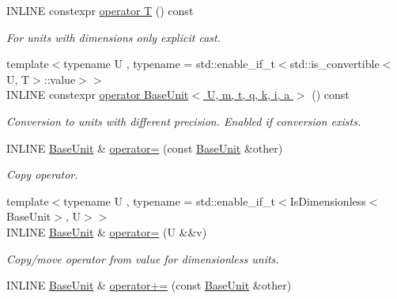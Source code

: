 \begin{DoxyCompactItemize}
I\+N\+L\+I\+NE constexpr \hyperlink{classBaseUnit_a5cf1571b1bb667033c7b6bf3709cd97a}{operator T} () const
\begin{DoxyCompactList}\small\item\em For units with dimensions only explicit cast. \end{DoxyCompactList}\item 
\hypertarget{classBaseUnit_af0040119677b2dd3636fbcab57106249}{}\label{classBaseUnit_af0040119677b2dd3636fbcab57106249} 
{\footnotesize template$<$typename U , typename  = std\+::enable\+\_\+if\+\_\+t$<$std\+::is\+\_\+convertible$<$\+U, T$>$\+::value$>$$>$ }\\I\+N\+L\+I\+NE constexpr \hyperlink{classBaseUnit_af0040119677b2dd3636fbcab57106249}{operator Base\+Unit$<$ U, m, t, q, k, i, a $>$} () const
\begin{DoxyCompactList}\small\item\em Conversion to units with different precision. Enabled if conversion exists. \end{DoxyCompactList}\item 
\hypertarget{classBaseUnit_a57707077e0872e159771390fac355951}{}\label{classBaseUnit_a57707077e0872e159771390fac355951} 
I\+N\+L\+I\+NE \hyperlink{classBaseUnit}{Base\+Unit} \& \hyperlink{classBaseUnit_a57707077e0872e159771390fac355951}{operator=} (const \hyperlink{classBaseUnit}{Base\+Unit} \&other)
\begin{DoxyCompactList}\small\item\em Copy operator. \end{DoxyCompactList}\item 
\hypertarget{classBaseUnit_a11a730f22fec43794e2892634075f829}{}\label{classBaseUnit_a11a730f22fec43794e2892634075f829} 
{\footnotesize template$<$typename U , typename  = std\+::enable\+\_\+if\+\_\+t$<$\+Is\+Dimensionless$<$\+Base\+Unit$>$, U$>$$>$ }\\I\+N\+L\+I\+NE \hyperlink{classBaseUnit}{Base\+Unit} \& \hyperlink{classBaseUnit_a11a730f22fec43794e2892634075f829}{operator=} (U \&\&v)
\begin{DoxyCompactList}\small\item\em Copy/move operator from value for dimensionless units. \end{DoxyCompactList}\item 
\hypertarget{classBaseUnit_a674605c391d10735c8b828041a01a0c1}{}\label{classBaseUnit_a674605c391d10735c8b828041a01a0c1} 
I\+N\+L\+I\+NE \hyperlink{classBaseUnit}{Base\+Unit} \& \hyperlink{classBaseUnit_a674605c391d10735c8b828041a01a0c1}{operator+=} (const \hyperlink{classBaseUnit}{Base\+Unit} \&other)

\end{DoxyCompactItemize}
